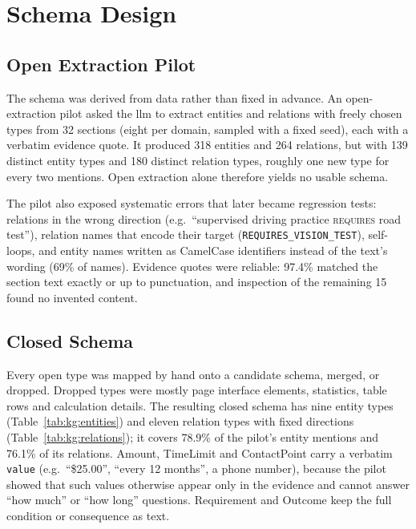 \section{Schema Design}\label{sec:kg:schema}

\subsection{Open Extraction Pilot}

The schema was derived from data rather than fixed in advance. An open-extraction
pilot asked the \gls{llm} to extract entities and relations with freely chosen
types from 32 sections (eight per domain, sampled with a fixed seed), each with a
verbatim evidence quote. It produced 318 entities and 264 relations, but with 139
distinct entity types and 180 distinct relation types, roughly one new type for
every two mentions. Open extraction alone therefore yields no usable schema.

The pilot also exposed systematic errors that later became regression tests:
relations in the wrong direction (e.g.\ ``supervised driving practice
\textsc{requires} road test''), relation names that encode their target
(\texttt{REQUIRES\_VISION\_TEST}), self-loops, and entity names written as CamelCase
identifiers instead of the text's wording (69\% of names). Evidence quotes were
reliable: 97.4\% matched the section text exactly or up to punctuation, and
inspection of the remaining 15 found no invented content.

\subsection{Closed Schema}

Every open type was mapped by hand onto a candidate schema, merged, or dropped.
Dropped types were mostly page interface elements, statistics, table rows and
calculation details. The resulting closed schema has nine entity types
(Table~\ref{tab:kg:entities}) and eleven relation types with fixed directions
(Table~\ref{tab:kg:relations}); it covers 78.9\% of the pilot's entity mentions
and 76.1\% of its relations. Amount, TimeLimit and ContactPoint carry a verbatim
\texttt{value} (e.g.\ ``\$25.00'', ``every 12 months'', a phone number), because
the pilot showed that such values otherwise appear only in the evidence and cannot
answer ``how much'' or ``how long'' questions. Requirement and Outcome keep the
full condition or consequence as text.

